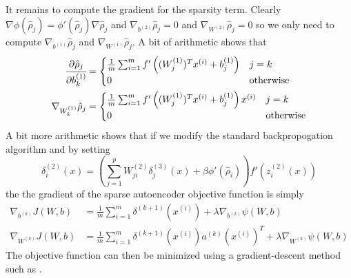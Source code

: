 \documentclass[twocolumn]{article}
\newcommand{\Wo}{W^{(1)}}
\newcommand{\Wt}{W^{(2)}}
\newcommand{\bo}{b^{(1)}}
\newcommand{\bt}{b^{(2)}}
\newcommand{\zt}{z^{(2)}}
\newcommand{\dr}{\delta^{(3)}}
\newcommand{\dt}{\delta^{(2)}}
\newcommand{\xii}{x^{(i)}}
\newcommand{\pd}[2]{\ensuremath{\cfrac{\partial #1}{\partial #2}}}
\begin{document}
It remains to compute the gradient for the sparsity term.
Clearly $\nabla\phi(\hat\rho_j)=\phi'(\hat\rho_j)\nabla\hat\rho_j$ and $\nabla_{\bt}\hat\rho_j=0$ and
$\nabla_{\Wt}\hat\rho_j=0$ so we only need to compute $\nabla_{\bo}\hat\rho_j$ and $\nabla_{\Wo}\hat\rho_j$.
A bit of arithmetic shows that
\begin{align*}
  \pd{\hat\rho_j}{\bo_k} &= \begin{cases} 
      \frac1m\sum_{i=1}^mf'\left((\Wo_j)^T\xii+\bo_j\right) & j=k \\
      0 & \textrm{otherwise}
  \end{cases} \\
    \nabla_{\Wo_k}\hat\rho_j &= \begin{cases}
      \frac1m\sum_{i=1}^mf'\left((\Wo_j)^T\xii+\bo_j\right)\xii & j=k \\
      0 & \textrm{otherwise}
    \end{cases}
\end{align*}
A bit more arithmetic shows that if we modify the standard backpropogation algorithm and by setting
\[\dt_i(x) = \left(\sum_{j=1}^p\Wt_{ji}\dr_j(x)+\beta\phi'(\hat\rho_i)\right)f'\left(\zt_i(x)\right)\]
the the gradient of the sparse autoencoder objective function is simply
\begin{align*}
  \nabla_{b^{(k)}}J(W,b) &= \frac1m\sum_{i=1}^m\delta^{(k+1)}(\xii) + \lambda\nabla_{b^{(k)}}\psi(W,b) \\
  \nabla_{W^{(k)}}J(W,b) &= \frac1m\sum_{i=1}^m\delta^{(k+1)}(\xii)a^{(k)}(\xii)^T
    + \lambda\nabla_{W^{(k)}}\psi(W,b)
\end{align*}
The objective function can then be minimized using a gradient-descent method such as \cite{zhu1997algorithm}.



\end{document}
